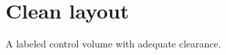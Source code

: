\documentclass{article}
\begin{document}
\section*{Clean layout}
A labeled control volume with adequate clearance.
\end{document}
